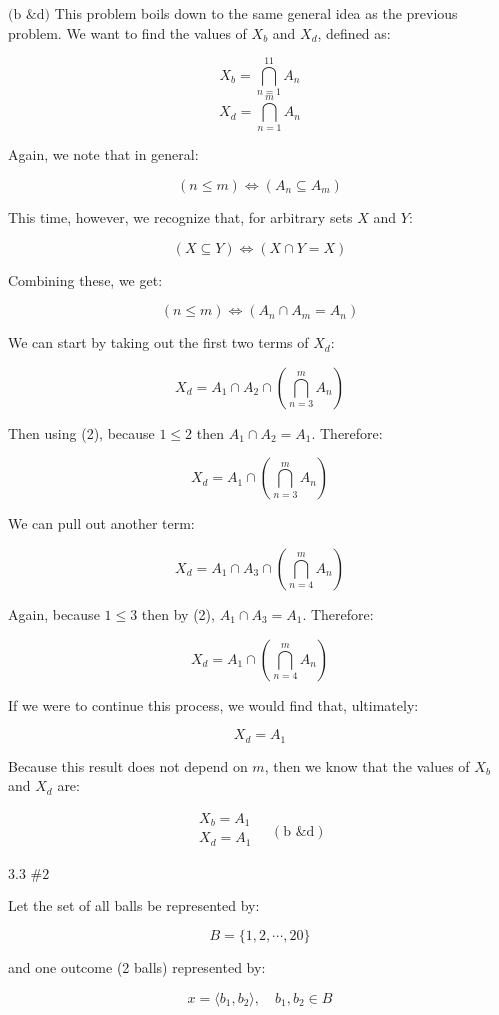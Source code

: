 \documentclass{article}
\newcommand{\problem}[2]{$\boxed{\text{#1 \##2}}$}
\newcommand{\subproblem}[1]{$\boxed{\text{(#1)}}$}
\newcommand{\subsolution}[2]{\boxed{#2\quad(\text{#1})}}
\begin{document}
\begin{multicols*}{2}
%
\subproblem{b \& d} This problem boils down to the same general idea
as the previous problem. We want to find the values of $X_b$ and
$X_d$, defined as:

\[
X_b=\bigcap\limits_{n=1}^{11} A_n
\] \[
X_d=\bigcap\limits_{n=1}^m A_n
\]

Again, we note that in general:

\[
(n\le m)\Leftrightarrow(A_n\subseteq A_m)
\]

This time, however, we recognize that, for arbitrary sets $X$ and $Y$:

\[
(X\subseteq Y)\Leftrightarrow(X\cap Y=X)
\]

Combining these, we get:

\[\tag{2}
(n\le m)\Leftrightarrow(A_n\cap A_m=A_n)
\]

We can start by taking out the first two terms of $X_d$:

\[
X_d=A_1\cap A_2\cap\left(\bigcap\limits_{n=3}^m A_n\right)
\]

Then using (2), because $1\le2$ then $A_1\cap{}A_2=A_1$. Therefore:

\[
X_d=A_1\cap\left(\bigcap\limits_{n=3}^m A_n\right)
\]

We can pull out another term:

\[
X_d=A_1\cap A_3\cap\left(\bigcap\limits_{n=4}^m A_n\right)
\]

Again, because $1\le3$ then by (2), $A_1\cap{}A_3=A_1$. Therefore:

\[
X_d=A_1\cap\left(\bigcap\limits_{n=4}^m A_n\right)
\]

If we were to continue this process, we would find that, ultimately:

\[
X_d=A_1
\]

Because this result does not depend on $m$, then we know that the
values of $X_b$ and $X_d$ are:

\[
\subsolution{b \& d}{\begin{array}{l}
X_b=A_1 \\
X_d=A_1 \\
\end{array}}
\]

%
\problem{3.3}{2}

Let the set of all balls be represented by:

\[
B=\{1,2,\cdots,20\}
\]

and one outcome (2 balls) represented by:

\[
x=\langle b_1, b_2\rangle,\quad b_1,b_2\in B
\]


\end{multicols*}
\end{document}
